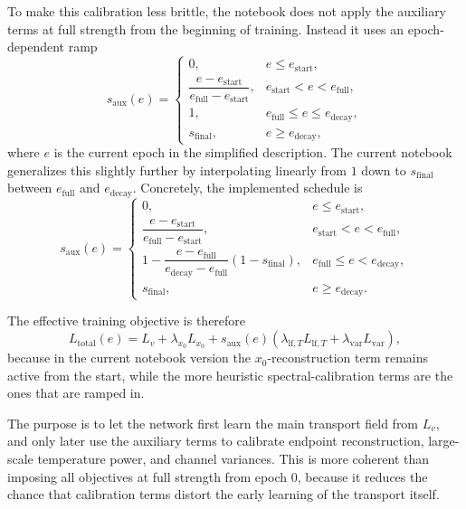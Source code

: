 \documentclass[11pt]{article}
\begin{document}
To make this calibration less brittle, the notebook does not apply the auxiliary terms at full strength from the beginning of training. Instead it uses an epoch-dependent ramp
\begin{equation}
  s_{\mathrm{aux}}(e)
  =
  \begin{cases}
    0, & e \le e_{\mathrm{start}},\\[0.5ex]
    \dfrac{e-e_{\mathrm{start}}}{e_{\mathrm{full}}-e_{\mathrm{start}}}, & e_{\mathrm{start}} < e < e_{\mathrm{full}},\\[2ex]
    1, & e_{\mathrm{full}} \le e \le e_{\mathrm{decay}},\\[0.5ex]
    s_{\mathrm{final}}, & e \ge e_{\mathrm{decay}},
  \end{cases}
\end{equation}
where \(e\) is the current epoch in the simplified description. The current notebook generalizes this slightly further by interpolating linearly from \(1\) down to \(s_{\mathrm{final}}\) between \(e_{\mathrm{full}}\) and \(e_{\mathrm{decay}}\). Concretely, the implemented schedule is
\begin{equation}
  s_{\mathrm{aux}}(e)
  =
  \begin{cases}
    0, & e \le e_{\mathrm{start}},\\[0.5ex]
    \dfrac{e-e_{\mathrm{start}}}{e_{\mathrm{full}}-e_{\mathrm{start}}}, & e_{\mathrm{start}} < e < e_{\mathrm{full}},\\[2ex]
    1 - \dfrac{e-e_{\mathrm{full}}}{e_{\mathrm{decay}}-e_{\mathrm{full}}}(1-s_{\mathrm{final}}),
      & e_{\mathrm{full}} \le e < e_{\mathrm{decay}},\\[2ex]
    s_{\mathrm{final}}, & e \ge e_{\mathrm{decay}}.
  \end{cases}
\end{equation}

The effective training objective is therefore
\begin{equation}
  L_{\mathrm{total}}(e)
  =
  L_v
  + \lambda_{x_0}L_{x_0}
  +
  s_{\mathrm{aux}}(e)
  \left(
    \lambda_{\mathrm{lf},T}L_{\mathrm{lf},T}
    + \lambda_{\mathrm{var}}L_{\mathrm{var}}
  \right),
\end{equation}
because in the current notebook version the \(x_0\)-reconstruction term remains active from the start, while the more heuristic spectral-calibration terms are the ones that are ramped in.

The purpose is to let the network first learn the main transport field from \(L_v\), and only later use the auxiliary terms to calibrate endpoint reconstruction, large-scale temperature power, and channel variances. This is more coherent than imposing all objectives at full strength from epoch \(0\), because it reduces the chance that calibration terms distort the early learning of the transport itself.
\end{document}
